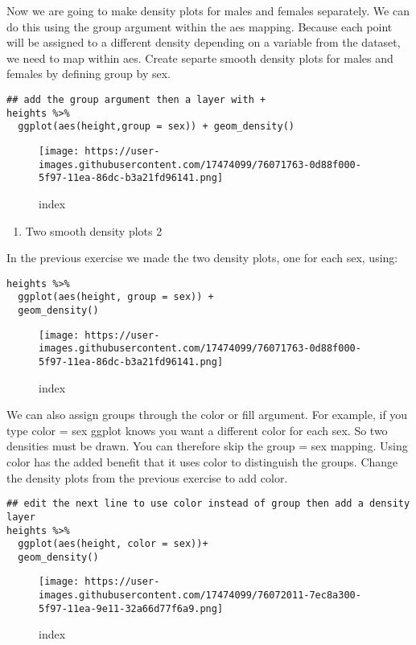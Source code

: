 \documentclass[]{article}
\providecommand{\tightlist}{%
  \setlength{\itemsep}{0pt}\setlength{\parskip}{0pt}}
\begin{document}
Now we are going to make density plots for males and females separately.
We can do this using the group argument within the aes mapping. Because
each point will be assigned to a different density depending on a
variable from the dataset, we need to map within aes. Create separte
smooth density plots for males and females by defining group by sex.

\begin{verbatim}
## add the group argument then a layer with +
heights %>% 
  ggplot(aes(height,group = sex)) + geom_density()
\end{verbatim}

\begin{figure}
\centering
\texttt{[image: https://user-images.githubusercontent.com/17474099/76071763-0d88f000-5f97-11ea-86dc-b3a21fd96141.png]}
\caption{index}
\end{figure}

\begin{enumerate}
\def\labelenumi{\arabic{enumi}.}
\setcounter{enumi}{20}
\tightlist
\item
  Two smooth density plots 2
\end{enumerate}

In the previous exercise we made the two density plots, one for each
sex, using:

\begin{verbatim}
heights %>% 
  ggplot(aes(height, group = sex)) + 
  geom_density()
\end{verbatim}

\begin{figure}
\centering
\texttt{[image: https://user-images.githubusercontent.com/17474099/76071763-0d88f000-5f97-11ea-86dc-b3a21fd96141.png]}
\caption{index}
\end{figure}

We can also assign groups through the color or fill argument. For
example, if you type color = sex ggplot knows you want a different color
for each sex. So two densities must be drawn. You can therefore skip the
group = sex mapping. Using color has the added benefit that it uses
color to distinguish the groups. Change the density plots from the
previous exercise to add color.

\begin{verbatim}
## edit the next line to use color instead of group then add a density layer
heights %>% 
  ggplot(aes(height, color = sex))+
  geom_density()
\end{verbatim}

\begin{figure}
\centering
\texttt{[image: https://user-images.githubusercontent.com/17474099/76072011-7ec8a300-5f97-11ea-9e11-32a66d77f6a9.png]}
\caption{index}
\end{figure}
\end{document}

